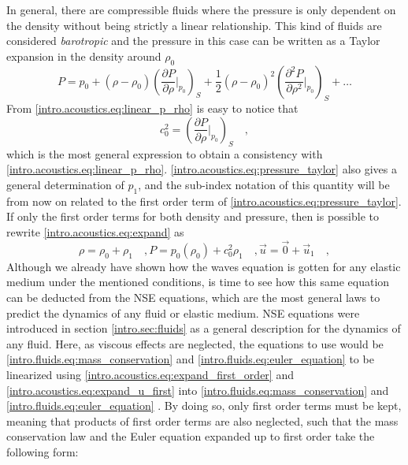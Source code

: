 In general, there are compressible fluids where the pressure is only dependent on the density without being strictly a linear relationship. This kind of fluids are considered \textit{barotropic} and the pressure in this case can be written as a Taylor expansion in the density around $\rho_0$
\begin{equation}\label{intro.acoustics.eq:pressure_taylor}
    P = p_0 + (\rho-\rho_0)\left(\frac{\partial P}{\partial\rho}\bigg|_{p_0}\right)_S + \frac{1}{2}(\rho-\rho_0)^2\left(\frac{\partial^2P}{\partial\rho^2}\bigg|_{p_0}\right)_S + \dots 
\end{equation}
From \ref{intro.acoustics.eq:linear_p_rho} is easy to notice that
\begin{equation}\label{intro.acoustics.eq:c2_dp_drho}
    c_0^2 = \left(\frac{\partial P}{\partial\rho}\bigg|_{p_0}\right)_S\quad,
\end{equation}
which is the most general expression to obtain a consistency with \ref{intro.acoustics.eq:linear_p_rho}. \ref{intro.acoustics.eq:pressure_taylor} also gives a general determination of $p_1$, and the sub-index notation of this quantity will be from now on related to the first order term of \ref{intro.acoustics.eq:pressure_taylor}. If only the first order terms for both density and pressure, then is possible to rewrite \ref{intro.acoustics.eq:expand} as
\begin{subequations}\label{intro.acoustics.eq:expand_first_order}
\begin{equation}\label{intro.acoustics.eq:expand_rho_first}
    \rho = \rho_0 + \rho_1\quad,
\end{equation}
\begin{equation}\label{intro.acoustics.eq:expand_p_first}
    P = p_0(\rho_0) + c_0^2\rho_1\quad,
\end{equation}    
\begin{equation}\label{intro.acoustics.eq:expand_u_first}
    \vec u = \vec 0 + \vec u_1\quad,
\end{equation}
\end{subequations}
Although we already have shown how the waves equation is gotten for any elastic medium under the mentioned conditions, is time to see how this same equation can be deducted from the NSE equations, which are the most general laws to predict the dynamics of any fluid or elastic medium. NSE equations were introduced in section \ref{intro.sec:fluids} as a general description for the dynamics of any fluid. Here, as viscous effects are neglected, the equations to use would be \ref{intro.fluids.eq:mass_conservation} and \ref{intro.fluids.eq:euler_equation} to be linearized using \ref{intro.acoustics.eq:expand_first_order} and \ref{intro.acoustics.eq:expand_u_first} into \ref{intro.fluids.eq:mass_conservation} and \ref{intro.fluids.eq:euler_equation} . By doing so, only first order terms must be kept, meaning that products of first order terms are also neglected, such that the mass conservation law and the Euler equation expanded up to first order take the following form:
